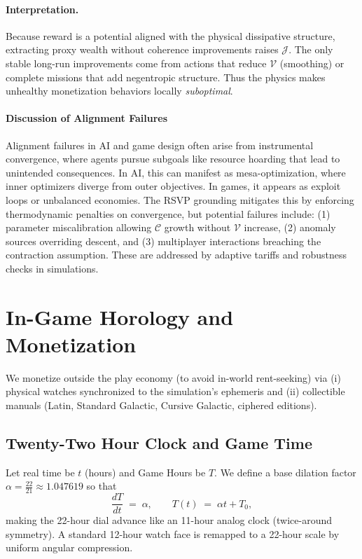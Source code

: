 \documentclass[12pt]{article}
\theoremstyle{definition}
\begin{document}
\paragraph{Interpretation.}
Because reward is a potential aligned with the physical dissipative structure, extracting proxy wealth without
coherence improvements raises $\mathcal{J}$. The only stable long-run improvements come from actions
that reduce $\mathcal{V}$ (smoothing) or complete missions that add negentropic structure.
Thus the physics makes unhealthy monetization behaviors locally \emph{suboptimal}.

\paragraph{Discussion of Alignment Failures}
Alignment failures in AI and game design often arise from instrumental convergence, where agents pursue subgoals like resource hoarding that lead to unintended consequences. In AI, this can manifest as mesa-optimization, where inner optimizers diverge from outer objectives. In games, it appears as exploit loops or unbalanced economies. The RSVP grounding mitigates this by enforcing thermodynamic penalties on convergence, but potential failures include: (1) parameter miscalibration allowing $\mathcal{C}$ growth without $\mathcal{V}$ increase, (2) anomaly sources overriding descent, and (3) multiplayer interactions breaching the contraction assumption. These are addressed by adaptive tariffs and robustness checks in simulations.

\section{In-Game Horology and Monetization}
\label{sec:horology}

We monetize outside the play economy (to avoid in-world rent-seeking) via (i) physical watches synchronized to the
simulation’s ephemeris and (ii) collectible manuals (Latin, Standard Galactic, Cursive Galactic, ciphered editions).

\subsection{Twenty-Two Hour Clock and Game Time}
Let real time be $t$ (hours) and Game Hours be $T$.
We define a base dilation factor $\alpha = \frac{22}{21} \approx 1.047619$ so that
\[
\frac{dT}{dt} \;=\; \alpha,
\qquad T(t) \;=\; \alpha t + T_0,
\]
making the 22-hour dial advance like an 11-hour analog clock (twice-around symmetry).
A standard 12-hour watch face is remapped to a 22-hour scale by uniform angular compression.
\end{document}
